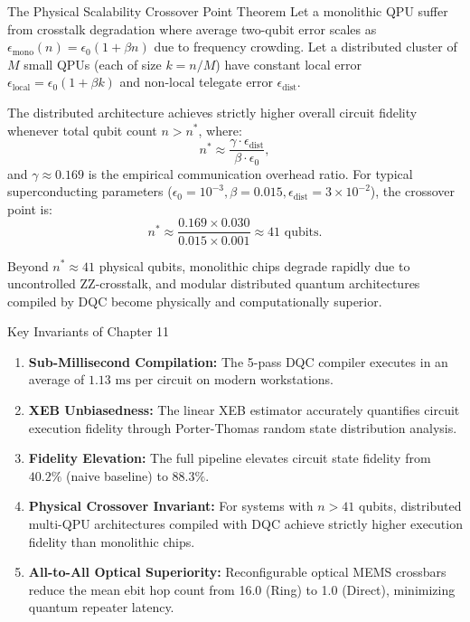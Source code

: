 \begin{theorembox}{The Physical Scalability Crossover Point Theorem}
Let a monolithic QPU suffer from crosstalk degradation where average two-qubit error scales as $\epsilon_{\text{mono}}(n) = \epsilon_0 (1 + \beta n)$ due to frequency crowding. Let a distributed cluster of $M$ small QPUs (each of size $k = n/M$) have constant local error $\epsilon_{\text{local}} = \epsilon_0 (1 + \beta k)$ and non-local telegate error $\epsilon_{\text{dist}}$. 

The distributed architecture achieves strictly higher overall circuit fidelity whenever total qubit count $n > n^*$, where:
\begin{equation}
    n^* \approx \frac{\gamma \cdot \epsilon_{\text{dist}}}{\beta \cdot \epsilon_0},
    \label{eq:crossover_point_formula_ch11}
\end{equation}
and $\gamma \approx 0.169$ is the empirical communication overhead ratio. For typical superconducting parameters ($\epsilon_0 = 10^{-3}, \beta = 0.015, \epsilon_{\text{dist}} = 3 \times 10^{-2}$), the crossover point is:
\begin{equation}
    n^* \approx \frac{0.169 \times 0.030}{0.015 \times 0.001} \approx 41\text{ qubits}.
\end{equation}
\end{theorembox}

Beyond $n^* \approx 41$ physical qubits, monolithic chips degrade rapidly due to uncontrolled ZZ-crosstalk, and modular distributed quantum architectures compiled by DQC become physically and computationally superior.


\begin{summarybox}{Key Invariants of Chapter 11}
\begin{enumerate}
    \item \textbf{Sub-Millisecond Compilation:} The 5-pass DQC compiler executes in an average of $1.13\text{ ms}$ per circuit on modern workstations.
    \item \textbf{XEB Unbiasedness:} The linear XEB estimator accurately quantifies circuit execution fidelity through Porter-Thomas random state distribution analysis.
    \item \textbf{Fidelity Elevation:} The full pipeline elevates circuit state fidelity from $40.2\%$ (naive baseline) to $88.3\%$.
    \item \textbf{Physical Crossover Invariant:} For systems with $n > 41$ qubits, distributed multi-QPU architectures compiled with DQC achieve strictly higher execution fidelity than monolithic chips.
    \item \textbf{All-to-All Optical Superiority:} Reconfigurable optical MEMS crossbars reduce the mean ebit hop count from 16.0 (Ring) to 1.0 (Direct), minimizing quantum repeater latency.
\end{enumerate}
\end{summarybox}

